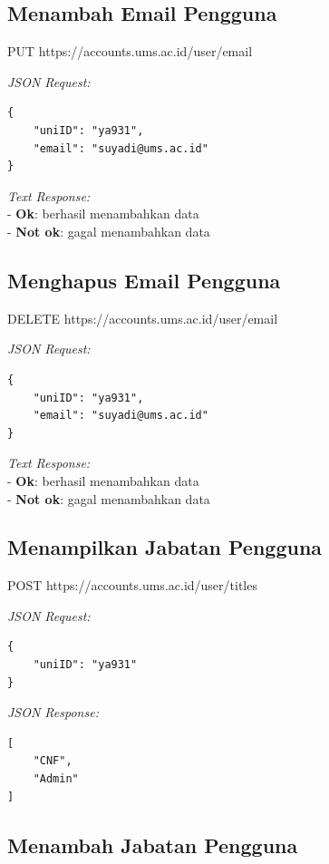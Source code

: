 \subsection{Menambah Email Pengguna}

PUT https://accounts.ums.ac.id/user/email

\noindent
\textit{JSON Request:}
\begin{lstlisting}
{
    "uniID": "ya931",
    "email": "suyadi@ums.ac.id"
}
\end{lstlisting}

\noindent
\textit{Text Response:}\\
- \textbf{Ok}: berhasil menambahkan data\\
-  \textbf{Not ok}: gagal menambahkan data

\subsection{Menghapus Email Pengguna}

DELETE https://accounts.ums.ac.id/user/email

\noindent
\textit{JSON Request:}
\begin{lstlisting}
{
    "uniID": "ya931",
    "email": "suyadi@ums.ac.id"
}
\end{lstlisting}

\noindent
\textit{Text Response:}\\
- \textbf{Ok}: berhasil menambahkan data\\
-  \textbf{Not ok}: gagal menambahkan data

\subsection{Menampilkan Jabatan Pengguna}

POST https://accounts.ums.ac.id/user/titles

\noindent
\textit{JSON Request:}
\begin{lstlisting}
{
    "uniID": "ya931"
}
\end{lstlisting}

\noindent
\textit{JSON Response:}
\begin{lstlisting}
[
    "CNF",
    "Admin"
]
\end{lstlisting}

\subsection{Menambah Jabatan Pengguna}

